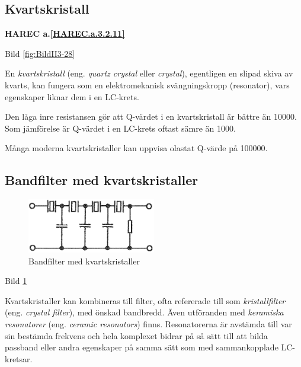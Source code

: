 \subsection{Kvartskristall}

\textbf{HAREC a.\ref{HAREC.a.3.2.11}\label{myHAREC.a.3.2.11}}

Bild \ref{fig:BildII3-28}

En \emph{kvartskristall} (eng. \emph{quartz crystal} eller \emph{crystal}),
egentligen en slipad skiva av kvarts, kan fungera som en
elektromekanisk svängningskropp (resonator), vars egenskaper liknar dem i en
LC-krets.

Den låga inre resistansen gör att Q-värdet i en kvartskristall är bättre än
10000. Som jämförelse är Q-värdet i en LC-krets oftast sämre än 1000.

Många moderna kvartskristaller kan uppvisa olastat Q-värde på 100000.

\vspace{12pt} %

\subsection{Bandfilter med kvartskristaller}

\begin{figure}
\includegraphics[width=0.5\textwidth]{images/cropped_pdfs/bild_2_3-29.pdf}
\caption{Bandfilter med kvartskristaller}
\label{fig:BildII3-29}
\end{figure}

Bild \ref{fig:BildII3-29}

Kvartskristaller kan kombineras till filter, ofta refererade till som
\emph{kristallfilter} (eng. \emph{crystal filter}), med önskad bandbredd. Även
utföranden med \emph{keramiska resonatorer} (eng. \emph{ceramic resonators})
finns. Resonatorerna är avstämda till var sin bestämda frekvens och hela
komplexet bidrar på så sätt till att bilda passband eller andra egenskaper på
samma sätt som med sammankopplade LC-kretsar.

